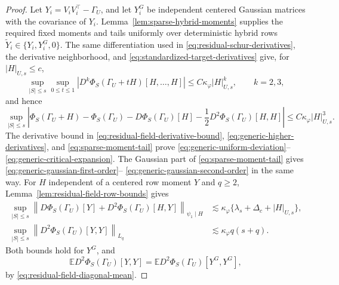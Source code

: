 \documentclass[a4paper,11pt,english]{article}
\newcommand{\E}{\mathbb E}
\newcommand{\norm}[1]{\left\lVert #1\right\rVert}
\begin{document}
\begin{proof}
Let $Y_i=V_iV_i^\top-\Gamma_U$, and let $Y_i^G$ be independent centered
Gaussian matrices with the covariance of $Y_i$.
Lemma~\ref{lem:sparse-hybrid-moments} supplies the required fixed moments
and tails uniformly over deterministic hybrid rows
$\widetilde Y_i\in\{Y_i,Y_i^G,0\}$.
The same differentiation used in
\eqref{eq:residual-schur-derivatives}, the derivative neighborhood, and
\eqref{eq:standardized-target-derivatives} give, for
$|H|_{U,s}\le c$,
\begin{equation}\label{eq:generic-higher-derivatives}
 \sup_{|S|\le s}\sup_{0\le t\le1}
 \left|D^k\Phi_S(\Gamma_U+tH)[H,\ldots,H]\right|
 \le C\kappa_\varphi|H|_{U,s}^k,
 \qquad k=2,3,
\end{equation}
and hence
\begin{equation}\label{eq:generic-taylor-remainder}
 \sup_{|S|\le s}\left|
 \Phi_S(\Gamma_U+H)-\Phi_S(\Gamma_U)-D\Phi_S(\Gamma_U)[H]
 -\frac12D^2\Phi_S(\Gamma_U)[H,H]
 \right|\le C\kappa_\varphi|H|_{U,s}^3.
\end{equation}
The derivative bound in
\eqref{eq:residual-field-derivative-bound},
\eqref{eq:generic-higher-derivatives}, and
\eqref{eq:sparse-moment-tail} prove
\eqref{eq:generic-uniform-deviation}--\eqref{eq:generic-critical-expansion}.
The Gaussian part of \eqref{eq:sparse-moment-tail} gives
\eqref{eq:generic-gaussian-first-order}--
\eqref{eq:generic-gaussian-second-order} in the same way.  For $H$
independent of a centered
row moment $Y$ and $q\ge2$, Lemma~\ref{lem:residual-field-row-bounds}
gives
\begin{align}
 \sup_{|S|\le s}
 \norm{D\Phi_S(\Gamma_U)[Y]+D^2\Phi_S(\Gamma_U)[H,Y]}_{\psi_1\mid H}
 &\lesssim\kappa_\varphi
 \{\lambda_s+\Delta_c+|H|_{U,s}\},
 \label{eq:generic-linear-row-bound}\\
 \sup_{|S|\le s}
 \norm{D^2\Phi_S(\Gamma_U)[Y,Y]}_{L_q}
 &\lesssim\kappa_\varphi q(s+q).
 \label{eq:generic-diagonal-row-bound}
\end{align}
Both bounds hold for $Y^G$, and
\begin{equation}\label{eq:generic-diagonal-mean-matching}
        \E D^2\Phi_S(\Gamma_U)[Y,Y]
        =\E D^2\Phi_S(\Gamma_U)[Y^G,Y^G],
\end{equation}
by \eqref{eq:residual-field-diagonal-mean}.


\end{proof}
\end{document}
